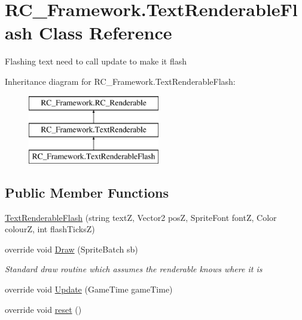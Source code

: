 \hypertarget{class_r_c___framework_1_1_text_renderable_flash}{}\section{R\+C\+\_\+\+Framework.\+Text\+Renderable\+Flash Class Reference}
\label{class_r_c___framework_1_1_text_renderable_flash}


Flashing text need to call update to make it flash  


Inheritance diagram for R\+C\+\_\+\+Framework.\+Text\+Renderable\+Flash\+:\begin{figure}[H]
\begin{center}
\leavevmode
\includegraphics[height=3.000000cm]{class_r_c___framework_1_1_text_renderable_flash}
\end{center}
\end{figure}
\subsection*{Public Member Functions}
\begin{DoxyCompactItemize}
\item 
\mbox{\hyperlink{class_r_c___framework_1_1_text_renderable_flash_a07a570327a0e5b7588311ee3c1075c7b}{Text\+Renderable\+Flash}} (string textZ, Vector2 posZ, Sprite\+Font fontZ, Color colourZ, int flash\+TicksZ)
\item 
override void \mbox{\hyperlink{class_r_c___framework_1_1_text_renderable_flash_ac917a0d6ed0b003f6565a7e822b517ba}{Draw}} (Sprite\+Batch sb)
\begin{DoxyCompactList}\small\item\em Standard draw routine which assumes the renderable knows where it is \end{DoxyCompactList}\item 
override void \mbox{\hyperlink{class_r_c___framework_1_1_text_renderable_flash_afbfac0d8d0ad1c2e3e8887d08dc87090}{Update}} (Game\+Time game\+Time)
\item 
override void \mbox{\hyperlink{class_r_c___framework_1_1_text_renderable_flash_a5caaf89017eb8df59bffaba6421b7b2e}{reset}} ()
\end{DoxyCompactItemize}

